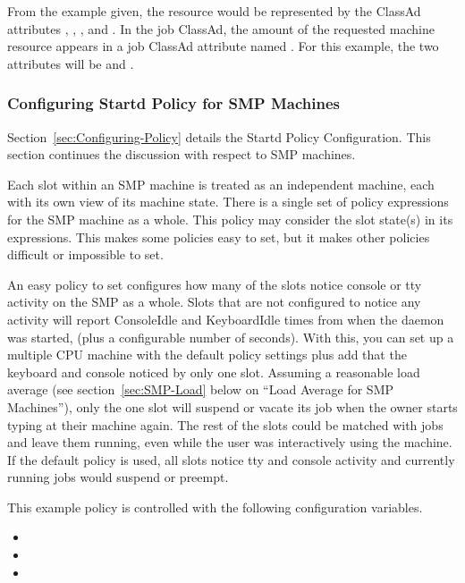 From the example given, the  resource would be represented by
the ClassAd attributes
, , , and .
In the job ClassAd, 
the amount of the requested machine resource appears 
in a job ClassAd attribute named .
For this example,
the two attributes will be  and .

\subsubsection{\label{sec:Config-SMP-Policy}
Configuring Startd Policy for SMP Machines}

Section~\ref{sec:Configuring-Policy} details the Startd
Policy Configuration.
This section continues the discussion with respect to SMP machines.

Each slot within an SMP machine is treated as an
independent machine,
each with its own view of its machine state.
There is a single set of policy expressions for the SMP machine
as a whole.
This policy may consider the slot state(s) in its expressions.
This makes some policies easy to set, but it makes
other policies difficult or impossible to set.

An easy policy to set
configures how many of the slots
notice console or tty activity on the SMP as a whole.
Slots that are not configured to notice any activity will report
ConsoleIdle and KeyboardIdle times from when the
 daemon was started,
(plus a configurable number of seconds).
With this, you can set up a multiple CPU machine with
the default policy
settings plus add that the keyboard and console noticed by only one
slot.
Assuming a reasonable load average (see
section~\ref{sec:SMP-Load} below on ``Load Average for SMP
Machines''), only the one slot will suspend or vacate its job
when the owner starts typing at their machine again.
The rest of the slots could be matched with jobs and leave
them running, even while the user was interactively using the
machine. 
If the default policy is used,
all slots notice
tty and console activity
and
currently running jobs would suspend or preempt.

This example policy is
controlled with the following configuration variables.
\begin{itemize}
\item {}
\item {}
\item {}
\end{itemize}

